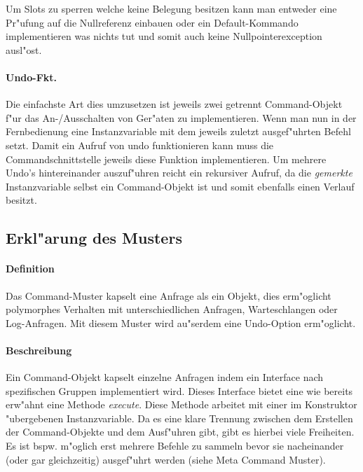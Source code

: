 Um Slots zu sperren welche keine Belegung besitzen kann man entweder eine Pr"ufung auf die Nullreferenz einbauen oder ein Default-Kommando implementieren was nichts tut und somit auch keine Nullpointerexception ausl"ost. 

\paragraph{Undo-Fkt.} 
Die einfachste Art dies umzusetzen ist jeweils zwei getrennt Command-Objekt f"ur das An-/Ausschalten von Ger"aten zu implementieren. Wenn man nun in der Fernbedienung eine Instanzvariable mit dem jeweils zuletzt ausgef"uhrten Befehl setzt. Damit ein Aufruf von undo funktionieren kann muss die Commandschnittstelle jeweils diese Funktion implementieren. Um mehrere Undo's hintereinander auszuf"uhren reicht ein rekursiver Aufruf, da die \emph{gemerkte} Instanzvariable selbst ein Command-Objekt ist und somit ebenfalls einen Verlauf besitzt.  


\subsection{Erkl"arung des Musters}
\paragraph{Definition}
Das Command-Muster kapselt eine Anfrage als ein Objekt, dies erm"oglicht polymorphes Verhalten mit unterschiedlichen Anfragen, Warteschlangen oder Log-Anfragen. Mit diesem Muster wird au"serdem eine Undo-Option erm"oglicht.

\paragraph{Beschreibung}
Ein Command-Objekt kapselt einzelne Anfragen indem ein Interface nach spezifischen Gruppen implementiert wird. Dieses Interface bietet eine wie bereits erw"ahnt eine Methode \emph{execute}. Diese Methode arbeitet mit einer im Konstruktor "ubergebenen Instanzvariable. Da es eine klare Trennung zwischen dem Erstellen der Command-Objekte und dem Ausf"uhren gibt, gibt es hierbei viele Freiheiten. Es ist bspw. m"oglich erst mehrere Befehle zu sammeln bevor sie nacheinander (oder gar gleichzeitig) ausgef"uhrt werden (siehe Meta Command Muster).

